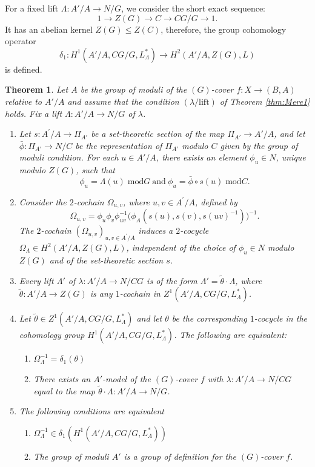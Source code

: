 \documentclass[10pt]{amsart}
\newtheorem{theorem}{Theorem}
\theoremstyle{definition}
\renewcommand{\mod}{{\;\mathrm{mod}}}
\begin{document}
For a fixed lift $\Lambda\colon A'/A \rightarrow N/G$, we consider the short exact sequence:
\[
  1 \rightarrow Z(G) \rightarrow  C \rightarrow CG/G \rightarrow 1.
\] 
It has an abelian kernel $Z(G) \leq Z(C)$, therefore, the group cohomology operator 
\[
\delta_1\colon H^1(A'/A,CG/G, L_\Lambda^*) \rightarrow 
H^2(A'/A,Z(G),L)
\]
is defined. 
\begin{theorem}{\label{thm:DebesDouaiThB}}
Let $A$ be the group of moduli of the $(G)$-cover $f\colon X \rightarrow (B,A)$ relative to $A'/A$ and assume that the condition $(\lambda/\textrm{lift})$ of Theorem \ref{thm:Mere1} holds. Fix a lift $\Lambda \colon A'/A \rightarrow N/G$ of $\lambda$. 
\begin{enumerate}
    \item Let $s\colon A^\prime/A \rightarrow \Pi_{A'}$ be a set-theoretic section of the map $\Pi_{A'} \rightarrow A'/A$, and let $\bar{\phi} \colon \Pi_{A'} \rightarrow N/C$ be the representation of $\Pi_{A'}$ modulo $C$ given by the group of moduli condition. For each $u \in A'/A$, there exists an element $\phi_u \in N$, unique modulo $Z(G)$, such that
    \[
      \phi_u=\Lambda(u) \mod G \ \text{and} \  \phi_u= \bar{\phi} \circ s(u) \mod C.
    \]
    \item Consider the $2$-cochain $\Omega_{u,v}$, where $u,v \in A^\prime/A$, defined by 
    \[
      \Omega_{u,v} = \phi_u \phi_v \phi_{uv}^{-1}
      \big(
        \phi_{A}(s(u),s(v),s(uv)^{-1})
         \big)^{-1}.
    \] The $2$-cochain $\left(\Omega_{u,v}\right)_{u,v\in A^\prime/A}$ induces a $2$-cocycle $\Omega_\Lambda \in H^2(A'/A,Z(G),L)$, independent of the choice of $\phi_u \in N$ modulo $Z(G)$ and of the set-theoretic section $s$.
    
    \item Every lift $\Lambda'$  of $\lambda\colon A'/A \rightarrow N/CG$ is of the form $\Lambda'= \tilde{\theta} \cdot \Lambda$, where $\tilde{\theta}\colon A'/A \rightarrow Z(G)$ is any $1$-cochain in $Z^1(A'/A,CG/G,L^*_\Lambda)$.
    
    \item Let $\tilde{\theta} \in Z^1(A'/A,CG/G,L^*_\Lambda)$ and let $\theta$ be the corresponding $1$-cocycle in the cohomology group $H^1(A'/A,CG/G,L^*_\Lambda)$. The following are equivalent: 
    \begin{enumerate}
        \item $\Omega_\Lambda^{-1}= \delta_1(\theta)$
        \item There exists an $A'$-model of the $(G)$-cover $f$ with $\lambda\colon A'/A \rightarrow N/CG$ equal to the map $\tilde{\theta} \cdot \Lambda \colon A'/A \rightarrow N/G$.
    \end{enumerate}
    \item The following conditions are equivalent 
    \begin{enumerate}
        \item $\Omega_\Lambda^{-1} \in \delta_1(H^1(A'/A,CG/G,L^*_\Lambda))$
        \item The group of moduli $A'$ is a group of definition for the $(G)$-cover $f$.
    \end{enumerate}
    

\end{enumerate}
\end{theorem}
\end{document}
